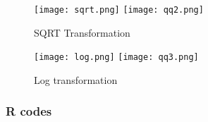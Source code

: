\documentclass[12pt]{article}
\begin{document}
	\begin{figure}[h]
		\centering
		\texttt{[image: sqrt.png]}\hfill
		\texttt{[image: qq2.png]}
		\caption{SQRT Transformation}
		\label{fig:SQRT}
	\end{figure}
	
	\begin{figure}[h]
		\centering
		\texttt{[image: log.png]}\hfill
		\texttt{[image: qq3.png]}
		\caption{Log transformation}
		\label{fig:Log}
	\end{figure}
	
	\clearpage
	
	\subsubsection*{R codes}
\end{document}
